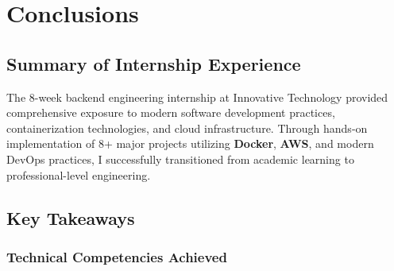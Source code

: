 
\section{Conclusions}

\subsection{Summary of Internship Experience}

The 8-week backend engineering internship at Innovative Technology provided comprehensive exposure to modern software development practices, containerization technologies, and cloud infrastructure. Through hands-on implementation of 8+ major projects utilizing \textbf{Docker}, \textbf{AWS}, and modern DevOps practices, I successfully transitioned from academic learning to professional-level engineering.

\subsection{Key Takeaways}

\subsubsection{Technical Competencies Achieved}

